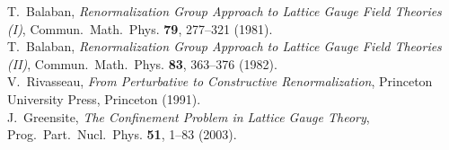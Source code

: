 \vspace{2em}

\begin{thebibliography}{99}
	
	T.~Balaban,
	\textit{Renormalization Group Approach to Lattice Gauge Field Theories (I)},
	Commun.~Math.~Phys. \textbf{79}, 277--321 (1981).
	\\[-0.75em]
	
	T.~Balaban,
	\textit{Renormalization Group Approach to Lattice Gauge Field Theories (II)},
	Commun.~Math.~Phys. \textbf{83}, 363--376 (1982).
	\\[-0.75em]
	
	V.~Rivasseau,
	\textit{From Perturbative to Constructive Renormalization},
	Princeton University Press, Princeton (1991).
	\\[-0.75em]
	
	J.~Greensite,
	\textit{The Confinement Problem in Lattice Gauge Theory},
	Prog.~Part.~Nucl.~Phys. \textbf{51}, 1--83 (2003).
	
\end{thebibliography}

